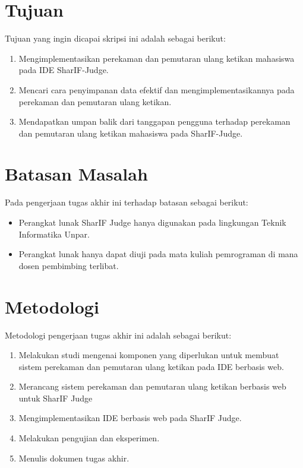 \section{Tujuan}
\label{sec:1:tujuan}

Tujuan yang ingin dicapai skripsi ini adalah sebagai berikut:
\begin{enumerate}
    \item Mengimplementasikan perekaman dan pemutaran ulang ketikan mahasiswa pada IDE SharIF-Judge.
    \item Mencari cara penyimpanan data efektif dan mengimplementasikannya pada perekaman dan pemutaran ulang ketikan.
    \item Mendapatkan umpan balik dari tanggapan pengguna terhadap perekaman dan pemutaran ulang ketikan mahasiswa pada SharIF-Judge.
\end{enumerate}

\section{Batasan Masalah}
\label{sec:1:batasan}

Pada pengerjaan tugas akhir ini terhadap batasan sebagai berikut:
\begin{itemize}
    \item Perangkat lunak SharIF Judge hanya digunakan pada lingkungan Teknik Informatika Unpar.
    \item Perangkat lunak hanya dapat diuji pada mata kuliah pemrograman di mana dosen pembimbing terlibat.
\end{itemize}

\section{Metodologi}
\label{sec:1:metlit}

Metodologi pengerjaan tugas akhir ini adalah sebagai berikut:
\begin{enumerate}
    \item Melakukan studi mengenai komponen yang diperlukan untuk membuat sistem perekaman dan pemutaran ulang ketikan pada IDE berbasis web.
    \item Merancang sistem perekaman dan pemutaran ulang ketikan berbasis web untuk SharIF Judge
    \item Mengimplementasikan IDE berbasis web pada SharIF Judge.
    \item Melakukan pengujian dan eksperimen.
    \item Menulis dokumen tugas akhir.
\end{enumerate}

